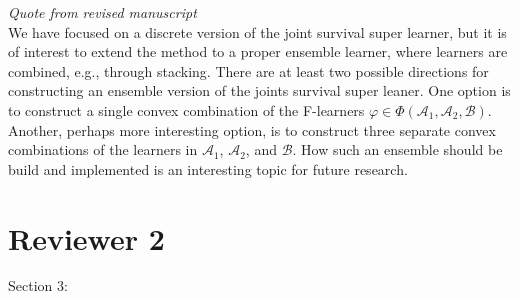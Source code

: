 \documentclass[a4paper,danish]{article}
\renewcommand{\phi}{\varphi}
\newcommand{\1}{\mathds{1}}
\newcommand{\qrev}[1]{
\vspace{.5em}
\begin{tcolorbox}[boxrule=0pt]
\hfill{\it\footnotesize Quote from revised manuscript}\\[.5em]
#1
\end{tcolorbox}
}
\begin{document}
\begin{enumerate}
\qrev{
We have focused on a discrete version of the joint survival super
learner, but it is of interest to extend the method to a proper
ensemble learner, where learners are combined, e.g., through
stacking. There are at least two possible directions for constructing
an ensemble version of the joints survival super leaner. One option is
to construct a single convex combination of the F-learners
\( \phi \in \Phi(\mathcal{A}_1, \mathcal{A}_2, \mathcal{B})
\). Another, perhaps more interesting option, is to construct
three separate convex combinations of the learners in
\( \mathcal{A}_1 \), \( \mathcal{A}_2 \), and \( \mathcal{B} \).  How
such an ensemble should be build and implemented is an interesting
topic for future research.
}
\end{enumerate}





\section*{Reviewer 2}
\label{sec:org498478f}

Section 3:
\end{document}
